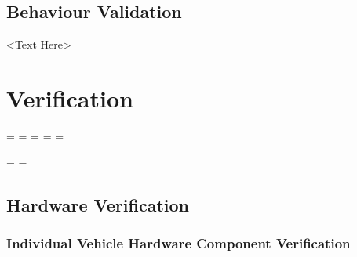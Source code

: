 \documentclass [10pt]{article}
\begin{document}
\subsection{Behaviour Validation}

<Text Here>


\section {Verification}









\newpage
\pagestyle{fancy}

\paperwidth=\pdfpageheight
\paperheight=\pdfpagewidth
\pdfpageheight=\paperheight
\pdfpagewidth=\paperwidth
\headwidth=\textheight



\begingroup

\vsize=\textwidth
\hsize=\textheight



\break

\subsection{Hardware Verification}
\subsubsection{Individual Vehicle Hardware Component Verification}
 
\end{document}
